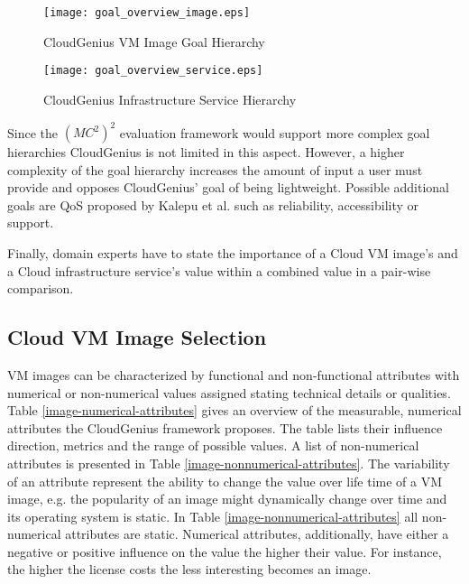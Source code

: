\documentclass[10pt]{article}
\begin{document}
\begin{figure}[h]
\centering
\texttt{[image: goal\_overview\_image.eps]} 
\caption{CloudGenius VM Image Goal Hierarchy}\label{overview-image-goals}
\end{figure}

\begin{figure}[h]
\centering
\texttt{[image: goal\_overview\_service.eps]} 
\caption{CloudGenius Infrastructure Service Hierarchy}\label{overview-service-goals}
\end{figure}

Since the $(MC^2)^2$ evaluation framework would support more complex goal hierarchies CloudGenius is not limited in this aspect. However, a higher complexity of the goal hierarchy increases the amount of input a user must provide and opposes CloudGenius' goal of being lightweight. Possible additional goals are QoS proposed by Kalepu et al. \cite{kalepu2003verity} such as reliability, accessibility or support.

Finally, domain experts have to state the importance of a Cloud VM image's and a Cloud infrastructure service's value within a combined value in a pair-wise comparison.

\subsection{Cloud VM Image Selection}

VM images can be characterized by functional and non-functional attributes with numerical or non-numerical values assigned stating technical details or qualities. Table \ref{image-numerical-attributes} gives an overview of the measurable, numerical attributes the CloudGenius framework proposes. The table lists their influence direction, metrics and the range of possible values. A list of non-numerical attributes is presented in Table \ref{image-nonnumerical-attributes}. The variability of an attribute represent the ability to change the value over life time of a VM image, e.g. the popularity of an image might dynamically change over time and its operating system is static. In Table \ref{image-nonnumerical-attributes} all non-numerical attributes are static. Numerical attributes, additionally, have either a negative or positive influence on the value the higher their value. For instance, the higher the license costs the less interesting becomes an image.
\end{document}
